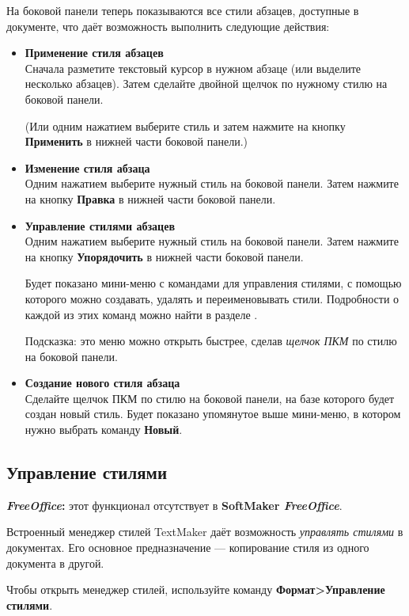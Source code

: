 ﻿\documentclass[a4paper,10pt]{article}
\begin{document}
На боковой панели теперь показываются все стили абзацев, доступные в документе, что даёт возможность выполнить следующие действия:
\begin{itemize}
 \item \textbf{Применение стиля абзацев}\\
 Сначала разметите текстовый курсор в нужном абзаце (или выделите несколько абзацев). Затем сделайте двойной щелчок по нужному стилю на боковой панели.
 
 (Или одним нажатием выберите стиль и затем нажмите на кнопку \textbf{Применить} в нижней части боковой панели.)
 \item \textbf{Изменение стиля абзаца}\\
 Одним нажатием выберите нужный стиль на боковой панели. Затем нажмите на кнопку \textbf{Правка} в нижней части боковой панели.
 \item \textbf{Управление стилями абзацев}\\
 Одним нажатием выберите нужный стиль на боковой панели. Затем нажмите на кнопку \textbf{Упорядочить} в нижней части боковой панели.
 
 Будет показано мини-меню с командами для управления стилями, с помощью которого можно создавать, удалять и переименовывать стили. Подробности о каждой из этих команд можно найти в разделе .
 
Подсказка: это меню можно открыть быстрее, сделав \textit{щелчок ПКМ} по стилю на боковой панели.
\item \textbf{Создание нового стиля абзаца}\\
Сделайте щелчок ПКМ по стилю на боковой панели, на базе которого будет создан новый стиль. Будет показано упомянутое выше мини-меню, в котором нужно выбрать команду \textbf{Новый}.
\end{itemize}
\pagebreak
\subsection{Управление стилями}
\begin{mdframed}[backgroundcolor=pink!50]
\textbf{\textit{FreeOffice}:} этот функционал отсутствует в \textbf{SoftMaker \textit{FreeOffice}}.
\end{mdframed}

Встроенный менеджер стилей TextMaker даёт возможность \textit{управлять стилями} в документах. Его основное предназначение — копирование стиля из одного документа в другой. 

Чтобы открыть менеджер стилей, используйте команду \textbf{Формат>Управление стилями}.
\end{document}
